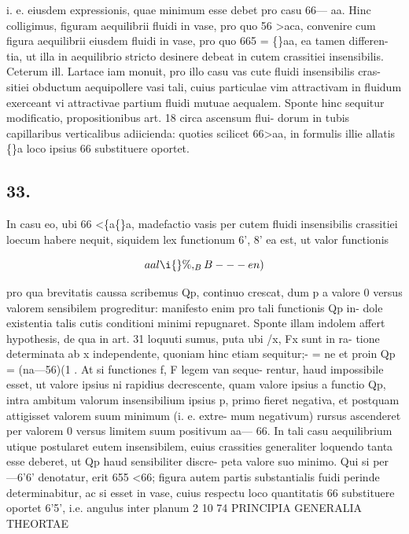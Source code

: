 \documentclass[12pt,a4paper]{article}
\begin{document}
i. e. eiusdem expressionis, quae minimum esse debet pro casu 66--- aa.       Hinc
colligimus, figuram aequilibrii fluidi in vase, pro quo 56 >aca, convenire cum
figura aequilibrii eiusdem fluidi in vase, pro quo 665 = \guillemotleft\{\}aa, ea tamen differen-
tia, ut illa in aequilibrio stricto desinere debeat in cutem crassitiei insensibilis.
Ceterum ill. Lartace iam monuit, pro illo casu vas cute fluidi insensibilis cras-
sitiei obductum aequipollere vasi tali, cuius particulae vim attractivam in fluidum
exerceant vi attractivae partium fluidi mutuae aequalem.
Sponte hinc sequitur modificatio, propositionibus art. 18 circa ascensum flui-
dorum in tubis capillaribus verticalibus adiicienda: quoties scilicet 66>aa, in
formulis illie allatis \guillemotleft\{\}a loco ipsius 66 substituere oportet.


\subsection*{33.}

In casu eo, ubi     66 <\{a\guillemotleft\{\}a,       madefactio vasis per cutem fluidi insensibilis
crassitiei loecum habere nequit, siquidem lex functionum            6', 8' ea est, ut valor
functionis

\[                               aal\i\{\} \%,_ BB             --- en)\]

pro qua brevitatis   caussa   scribemus     Qp,    continuo   crescat,   dum    p a valore    0
versus valorem sensibilem progreditur: manifesto enim pro tali functionis             Qp in-
dole existentia talis cutis conditioni minimi repugnaret.           Sponte illam indolem
affert hypothesis, de qua in art. 31 loquuti sumus, puta ubi /x, Fx sunt in ra-
tione determinata ab x independente, quoniam hinc etiam sequitur;- = ne et
proin Qp = (na---56)(1 .                At si functiones f, F legem van                 seque-
rentur, haud impossibile esset, ut valore ipsius ni rapidius decrescente, quam
valore ipsius a functio Qp, intra ambitum valorum insensibilium ipsius p,
primo fieret negativa, et postquam attigisset valorem suum minimum (i. e. extre-
mum negativum) rursus ascenderet per valorem 0 versus limitem suum positivum
aa--- 66. In tali casu aequilibrium utique postularet eutem insensibilem, euius
crassities generaliter loquendo tanta esse deberet, ut Qp haud sensibiliter discre-
peta valore suo minimo. Qui si per ---6'6' denotatur, erit 655 <66; figura
autem partis substantialis fuidi perinde determinabitur, ac si esset in vase, cuius
respectu loco quantitatis 66 substituere oportet 6'5', i.e. angulus inter planum
2                                                                        10
74                                     PRINCIPIA   GENERALIA          THEORTAE
\end{document}
